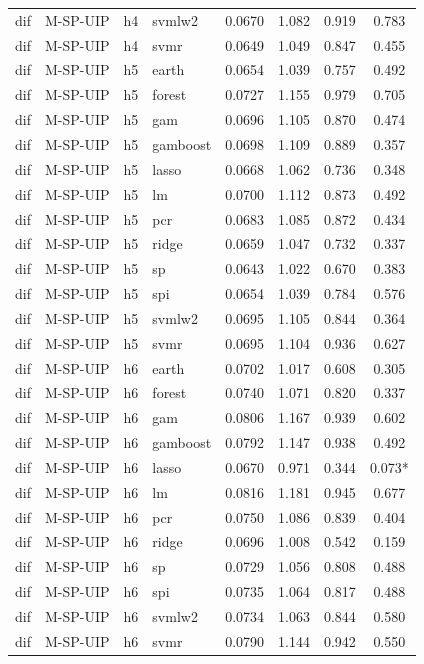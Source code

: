 \begin{ThreePartTable}
\begin{longtable}[t]{llclcccc}
dif & M-SP-UIP & h4 & svmlw2 & 0.0670 & 1.082 & 0.919 & 0.783\\
dif & M-SP-UIP & h4 & svmr & 0.0649 & 1.049 & 0.847 & 0.455\\
\addlinespace
dif & M-SP-UIP & h5 & earth & 0.0654 & 1.039 & 0.757 & 0.492\\
dif & M-SP-UIP & h5 & forest & 0.0727 & 1.155 & 0.979 & 0.705\\
dif & M-SP-UIP & h5 & gam & 0.0696 & 1.105 & 0.870 & 0.474\\
dif & M-SP-UIP & h5 & gamboost & 0.0698 & 1.109 & 0.889 & 0.357\\
dif & M-SP-UIP & h5 & lasso & 0.0668 & 1.062 & 0.736 & 0.348\\
dif & M-SP-UIP & h5 & lm & 0.0700 & 1.112 & 0.873 & 0.492\\
dif & M-SP-UIP & h5 & pcr & 0.0683 & 1.085 & 0.872 & 0.434\\
dif & M-SP-UIP & h5 & ridge & 0.0659 & 1.047 & 0.732 & 0.337\\
dif & M-SP-UIP & h5 & sp & 0.0643 & 1.022 & 0.670 & 0.383\\
dif & M-SP-UIP & h5 & spi & 0.0654 & 1.039 & 0.784 & 0.576\\
dif & M-SP-UIP & h5 & svmlw2 & 0.0695 & 1.105 & 0.844 & 0.364\\
dif & M-SP-UIP & h5 & svmr & 0.0695 & 1.104 & 0.936 & 0.627\\
\addlinespace
dif & M-SP-UIP & h6 & earth & 0.0702 & 1.017 & 0.608 & 0.305\\
dif & M-SP-UIP & h6 & forest & 0.0740 & 1.071 & 0.820 & 0.337\\
dif & M-SP-UIP & h6 & gam & 0.0806 & 1.167 & 0.939 & 0.602\\
dif & M-SP-UIP & h6 & gamboost & 0.0792 & 1.147 & 0.938 & 0.492\\
dif & M-SP-UIP & h6 & lasso & 0.0670 & 0.971 & 0.344 & 0.073*\\
dif & M-SP-UIP & h6 & lm & 0.0816 & 1.181 & 0.945 & 0.677\\
dif & M-SP-UIP & h6 & pcr & 0.0750 & 1.086 & 0.839 & 0.404\\
dif & M-SP-UIP & h6 & ridge & 0.0696 & 1.008 & 0.542 & 0.159\\
dif & M-SP-UIP & h6 & sp & 0.0729 & 1.056 & 0.808 & 0.488\\
dif & M-SP-UIP & h6 & spi & 0.0735 & 1.064 & 0.817 & 0.488\\
dif & M-SP-UIP & h6 & svmlw2 & 0.0734 & 1.063 & 0.844 & 0.580\\
dif & M-SP-UIP & h6 & svmr & 0.0790 & 1.144 & 0.942 & 0.550\\

\end{longtable}
\end{ThreePartTable}
